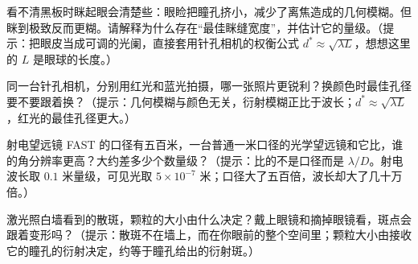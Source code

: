\begin{puzzles}
\item 看不清黑板时眯起眼会清楚些：眼睑把瞳孔挤小，减少了离焦造成的几何模糊。但眯到极致反而更糊。请解释为什么存在“最佳眯缝宽度”，并估计它的量级。（提示：把眼皮当成可调的光阑，直接套用针孔相机的权衡公式 \(d^{*}\approx\sqrt{\lambda L}\)，想想这里的 \(L\) 是眼球的长度。）
\item 同一台针孔相机，分别用红光和蓝光拍摄，哪一张照片更锐利？换颜色时最佳孔径要不要跟着换？（提示：几何模糊与颜色无关，衍射模糊正比于波长；\(d^{*}\approx\sqrt{\lambda L}\)，红光的最佳孔径更大。）
\item 射电望远镜 FAST 的口径有五百米，一台普通一米口径的光学望远镜和它比，谁的角分辨率更高？大约差多少个数量级？（提示：比的不是口径而是 \(\lambda/D\)。射电波长取 \(0.1\) 米量级，可见光取 \(5\times10^{-7}\) 米；口径大了五百倍，波长却大了几十万倍。）
\item 激光照白墙看到的散斑，颗粒的大小由什么决定？戴上眼镜和摘掉眼镜看，斑点会跟着变形吗？（提示：散斑不在墙上，而在你眼前的整个空间里；颗粒大小由接收它的瞳孔的衍射决定，约等于瞳孔给出的衍射斑。）
\end{puzzles}
